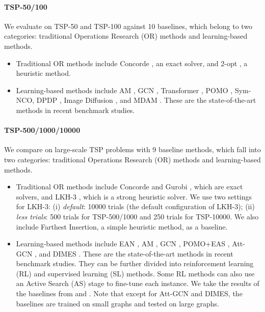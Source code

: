 \paragraph{TSP-50/100} We evaluate \method{} on TSP-50 and TSP-100 against 10 baselines, which belong to two categories: traditional Operations Research (OR) methods and learning-based methods. \begin{itemize}[leftmargin=0.15in] \item Traditional OR methods include Concorde \citep{applegate2006concorde}, an exact solver, and 2-opt \citep{lin1973effective}, a heuristic method. \item Learning-based methods include AM \citep{19iclr-am}, GCN \citep{joshi2019efficient}, Transformer \citep{bresson2021transformer}, POMO \citep{kwon2020pomo}, Sym-NCO\citep{kim2022symnco}, DPDP \citep{ma2021learning}, Image Diffusion \citep{graikos2022diffusion}, and MDAM \citep{xin2021multi}. These are the state-of-the-art methods in recent benchmark studies. \end{itemize}

\paragraph{TSP-500/1000/10000}


We compare \method{} on large-scale TSP problems with 9 baseline methods, which fall into two categories: traditional Operations Research (OR) methods and learning-based methods. \begin{itemize}[leftmargin=0.15in] \item Traditional OR methods include Concorde \citep{applegate2006concorde} and Gurobi \citep{gurobi2018gurobi}, which are exact solvers, and LKH-3 \citep{lkh3}, which is a strong heuristic solver. We use two settings for LKH-3: (i) \emph{default}: 10000 trials (the default configuration of LKH-3); (ii) \emph{less trials}: 500 trials for TSP-500/1000 and 250 trials for TSP-10000. We also include Farthest Insertion, a simple heuristic method, as a baseline. \item Learning-based methods include EAN \citep{ean}, AM \citep{19iclr-am}, GCN \citep{joshi2019efficient}, POMO+EAS \citep{kwon2020pomo, hottung2021efficient}, Att-GCN \citep{fu2021generalize}, and DIMES \citep{qiudimes}. These are the state-of-the-art methods in recent benchmark studies. They can be further divided into reinforcement learning (RL) and supervised learning (SL) methods. Some RL methods can also use an Active Search (AS) stage \citep{bello2016neural} to fine-tune each instance. We take the results of the baselines from \citet{fu2021generalize} and \citet{qiudimes}. Note that except for Att-GCN and DIMES, the baselines are trained on small graphs and tested on large graphs. \end{itemize}

